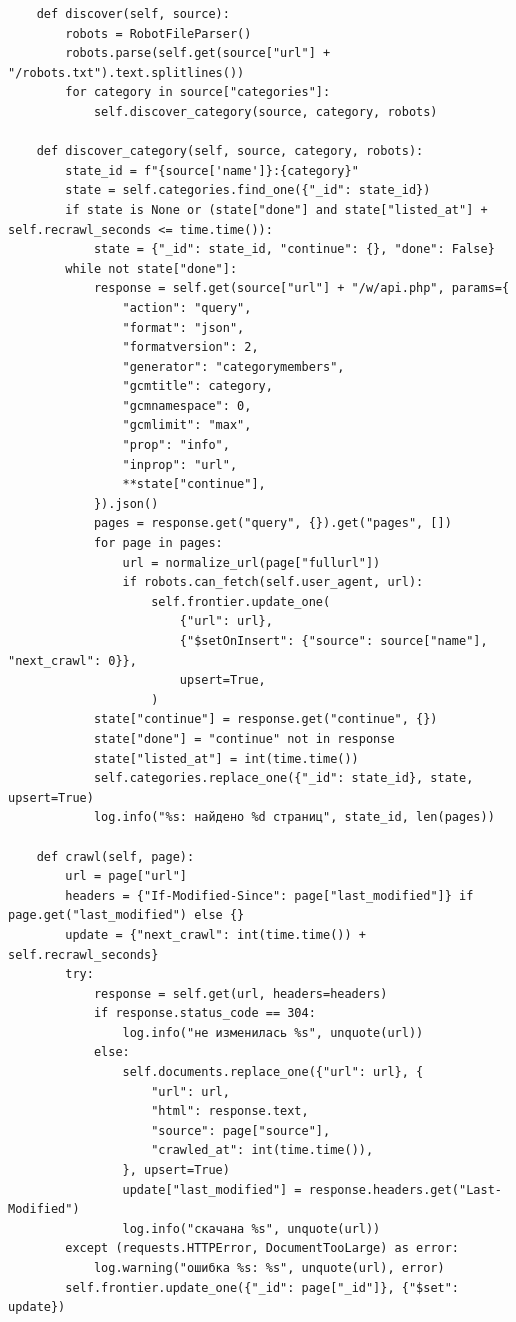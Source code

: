 \documentclass[12pt,a4paper,oneside,fleqn]{article}
\begin{document}
\begin{lstlisting}
    def discover(self, source):
        robots = RobotFileParser()
        robots.parse(self.get(source["url"] + "/robots.txt").text.splitlines())
        for category in source["categories"]:
            self.discover_category(source, category, robots)

    def discover_category(self, source, category, robots):
        state_id = f"{source['name']}:{category}"
        state = self.categories.find_one({"_id": state_id})
        if state is None or (state["done"] and state["listed_at"] + self.recrawl_seconds <= time.time()):
            state = {"_id": state_id, "continue": {}, "done": False}
        while not state["done"]:
            response = self.get(source["url"] + "/w/api.php", params={
                "action": "query",
                "format": "json",
                "formatversion": 2,
                "generator": "categorymembers",
                "gcmtitle": category,
                "gcmnamespace": 0,
                "gcmlimit": "max",
                "prop": "info",
                "inprop": "url",
                **state["continue"],
            }).json()
            pages = response.get("query", {}).get("pages", [])
            for page in pages:
                url = normalize_url(page["fullurl"])
                if robots.can_fetch(self.user_agent, url):
                    self.frontier.update_one(
                        {"url": url},
                        {"$setOnInsert": {"source": source["name"], "next_crawl": 0}},
                        upsert=True,
                    )
            state["continue"] = response.get("continue", {})
            state["done"] = "continue" not in response
            state["listed_at"] = int(time.time())
            self.categories.replace_one({"_id": state_id}, state, upsert=True)
            log.info("%s: найдено %d страниц", state_id, len(pages))

    def crawl(self, page):
        url = page["url"]
        headers = {"If-Modified-Since": page["last_modified"]} if page.get("last_modified") else {}
        update = {"next_crawl": int(time.time()) + self.recrawl_seconds}
        try:
            response = self.get(url, headers=headers)
            if response.status_code == 304:
                log.info("не изменилась %s", unquote(url))
            else:
                self.documents.replace_one({"url": url}, {
                    "url": url,
                    "html": response.text,
                    "source": page["source"],
                    "crawled_at": int(time.time()),
                }, upsert=True)
                update["last_modified"] = response.headers.get("Last-Modified")
                log.info("скачана %s", unquote(url))
        except (requests.HTTPError, DocumentTooLarge) as error:
            log.warning("ошибка %s: %s", unquote(url), error)
        self.frontier.update_one({"_id": page["_id"]}, {"$set": update})


\end{lstlisting}
\end{document}
